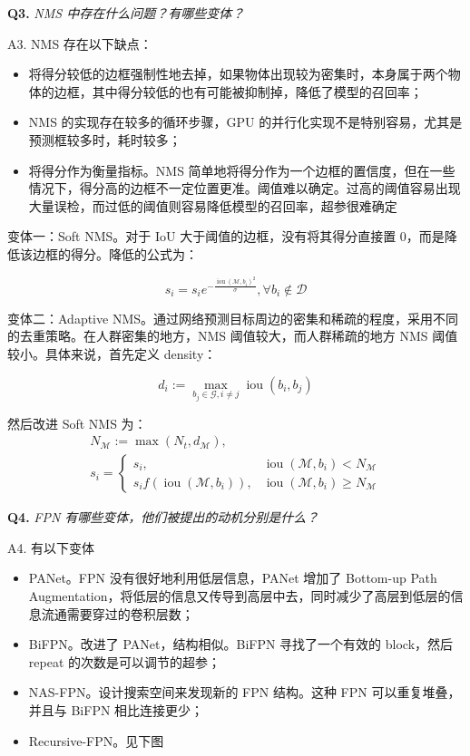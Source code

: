 \documentclass[cn,10pt,math=newtx,citestyle=gb7714-2015,bibstyle=gb7714-2015]{elegantbook}
\begin{document}
\textbf{Q3.} \textit{NMS 中存在什么问题？有哪些变体？}

A3. NMS 存在以下缺点：
\begin{itemize}
  \item 将得分较低的边框强制性地去掉，如果物体出现较为密集时，本身属于两个物体的边框，其中得分较低的也有可能被抑制掉，降低了模型的召回率；
  \item NMS 的实现存在较多的循环步骤，GPU 的并行化实现不是特别容易，尤其是预测框较多时，耗时较多；
  \item 将得分作为衡量指标。NMS 简单地将得分作为一个边框的置信度，但在一些情况下，得分高的边框不一定位置更准。阈值难以确定。过高的阈值容易出现大量误检，而过低的阈值则容易降低模型的召回率，超参很难确定
\end{itemize}


变体一：Soft NMS。对于 IoU 大于阈值的边框，没有将其得分直接置 0，而是降低该边框的得分。降低的公式为：

\begin{equation}
s_{i}=s_{i} e^{-\frac{\operatorname{iou}\left(\mathcal{M}, b_{i}\right)^{2}}{\sigma}}, \forall b_{i} \notin \mathcal{D}
\end{equation}

变体二：Adaptive NMS。通过网络预测目标周边的密集和稀疏的程度，采用不同的去重策略。在人群密集的地方，NMS 阈值较大，而人群稀疏的地方 NMS 阈值较小。具体来说，首先定义 density：

\begin{equation}
d_{i}:=\max _{b_{j} \in \mathcal{G}, i \neq j} \operatorname{iou}\left(b_{i}, b_{j}\right)
\end{equation}

然后改进 Soft NMS 为：
\begin{equation}
\begin{gathered}
N_{\mathcal{M}}:=\max \left(N_{t}, d_{\mathcal{M}}\right), \\
s_{i}= \begin{cases}s_{i}, & \operatorname{iou}\left(\mathcal{M}, b_{i}\right)<N_{\mathcal{M}} \\
s_{i} f\left(\operatorname{iou}\left(\mathcal{M}, b_{i}\right)\right), & \operatorname{iou}\left(\mathcal{M}, b_{i}\right) \geq N_{\mathcal{M}}\end{cases}
\end{gathered}
\end{equation}


\textbf{Q4.} \textit{FPN 有哪些变体，他们被提出的动机分别是什么？}

A4. 有以下变体
\begin{itemize}
  \item PANet。FPN 没有很好地利用低层信息，PANet 增加了 Bottom-up Path Augmentation，将低层的信息又传导到高层中去，同时减少了高层到低层的信息流通需要穿过的卷积层数；
  \item BiFPN。改进了 PANet，结构相似。BiFPN 寻找了一个有效的 block，然后 repeat 的次数是可以调节的超参；
  \item NAS-FPN。设计搜索空间来发现新的 FPN 结构。这种 FPN 可以重复堆叠，并且与 BiFPN 相比连接更少；
  \item Recursive-FPN。见下图
\end{itemize}
\end{document}
